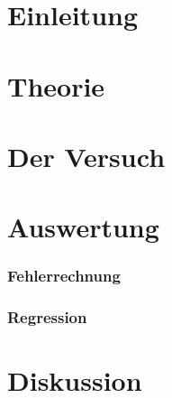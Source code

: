 \documentclass[a4,11pt]{article}
\newcommand{\V}{V500}
\begin{document}



\tableofcontents
\clearpage


\section{Einleitung}



\section{Theorie}

\clearpage


\section{Der Versuch}

\clearpage


\section{Auswertung}
\subsubsection{Fehlerrechnung}
\label{sec:Fehlerrechnung}

\subsubsection{Regression}
\label{sec:regression}


\clearpage


\section{Diskussion}


\clearpage
\listoftodos
\listoffigures
\listoftables
\clearpage
\nocite{\V}
\printbibliography[title = Literaturverzeichnis]
\end{document}
